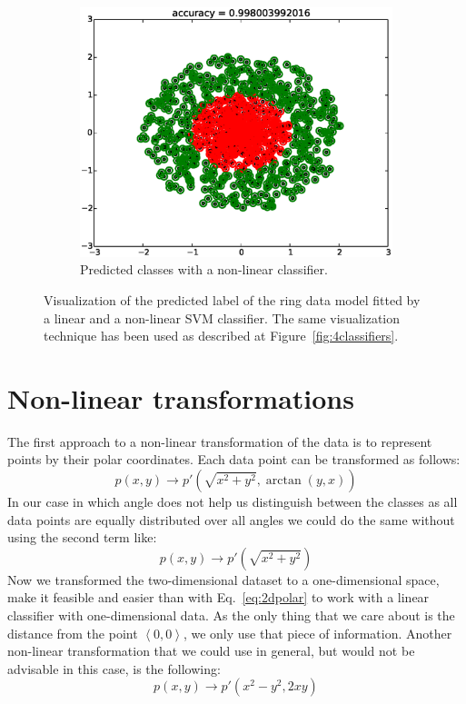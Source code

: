 \documentclass[a4paper,10pt]{article}
\begin{document}
\begin{figure}[ht!]
\begin{subfigure}{.49\textwidth}
    \includegraphics[width=1.00\textwidth]{ringNonLinearFit.eps}
    \caption{Predicted classes with a non-linear classifier.}
    \end{subfigure}
    \caption{Visualization of the predicted label of the ring data model fitted by a linear and a non-linear SVM classifier.  The same visualization technique has been used as described at Figure~\ref{fig:4classifiers}.}
    \label{fig:ringLinear}
\end{figure}


\section{Non-linear transformations}
The first approach to a non-linear transformation of the data is to represent points by their polar coordinates.  Each data point can be transformed as follows:
\begin{equation}
p(x,y) \rightarrow p'(\sqrt{x^2 + y^2}, \arctan(y,x))
\label{eq:2dpolar}
\end{equation}
In our case in which angle does not help us distinguish between the classes as all data points are equally distributed over all angles we could do the same without using the second term like:
\begin{equation}
p(x,y) \rightarrow p'(\sqrt{x^2 + y^2})
\end{equation}
Now we transformed the two-dimensional dataset to a one-dimensional space, make it feasible and easier than with Eq.~\ref{eq:2dpolar} to work with a linear classifier with one-dimensional data. As the only thing that we care about is the distance from the point $\left<0,0\right>$, we only use that piece of information. Another non-linear transformation that we could use in general, but would not be advisable in this case, is the following:
\begin{equation}
p(x,y) \rightarrow p'(x^2 - y^2, 2xy)
\end{equation}
\end{document}
